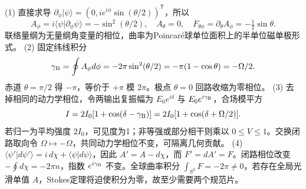 (1) 直接求导 \(\partial_\phi|\psi\rangle=(0,ie^{i\phi}\sin(\theta/2))^{\mathsf T}\)，所以
\[
A_\phi=i\langle\psi|\partial_\phi\psi\rangle=-\sin^2(\theta/2),\quad A_\theta=0,\quad F_{\theta\phi}=\partial_\theta A_\phi=-\tfrac12\sin\theta.
\]
联络量纲为无量纲角变量的相位，曲率为Poincaré球单位面积上的半单位磁单极形式。
(2) 固定纬线积分
\[
\gamma_{\rm B}=\oint A_\phi d\phi=-2\pi\sin^2(\theta/2)=-\pi(1-\cos\theta)=-\Omega/2.
\]
赤道 \(\theta=\pi/2\) 得 \(-\pi\)，等价于 \(+\pi\) 模 \(2\pi\)。极点 \(\theta=0\) 回路收缩为零相位。
(3) 去掉相同的动力学相位，令两输出复振幅为 \(E_0e^{i\delta}\) 与 \(E_0e^{i\gamma_{\rm B}}\)，合场模平方
\[
I=2I_0[1+\cos(\delta-\gamma_{\rm B})]
=2I_0[1+\cos(\delta+\Omega/2)].
\]
若归一为平均强度 \(2I_0\)，可见度为1；非等强或部分相干则乘以 \(0\le V\le1\)。交换闭路取向令 \(\Omega\mapsto-\Omega\)，共同动力学相位不变，可隔离几何贡献。
(4) \(\langle\psi'|d\psi'\rangle=i\,d\chi+\langle\psi|d\psi\rangle\)，因此 \(A'=A-d\chi\)，而 \(F'=dA'=F\)。闭路相位改变 \(-\oint d\chi=-2\pi n\)，指数 \(e^{i\gamma_{\rm B}}\) 不变。全球曲率积分 \(\int_{S^2}F=-2\pi\ne0\)，若存在全局光滑单值 \(A\)，Stokes定理将迫使积分为零，故至少需要两个规范片。

